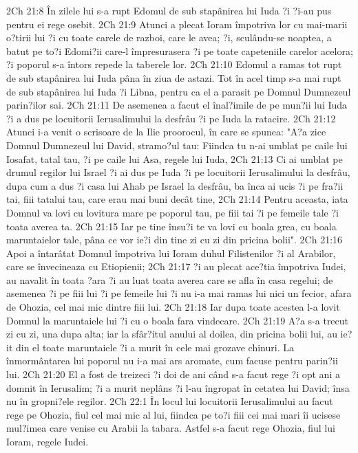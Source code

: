 2Ch 21:8  În zilele lui s-a rupt Edomul de sub stapânirea lui Iuda ?i ?i-au pus pentru ei rege osebit.
2Ch 21:9  Atunci a plecat Ioram împotriva lor cu mai-marii o?tirii lui ?i cu toate carele de razboi, care le avea; ?i, sculându-se noaptea, a batut pe to?i Edomi?ii care-l împresurasera ?i pe toate capeteniile carelor acelora; ?i poporul s-a întors repede la taberele lor.
2Ch 21:10  Edomul a ramas tot rupt de sub stapânirea lui Iuda pâna în ziua de astazi. Tot în acel timp s-a mai rupt de sub stapânirea lui Iuda ?i Libna, pentru ca el a parasit pe Domnul Dumnezeul parin?ilor sai.
2Ch 21:11  De asemenea a facut el înal?imile de pe mun?ii lui Iuda ?i a dus pe locuitorii Ierusalimului la desfrâu ?i pe Iuda la ratacire.
2Ch 21:12  Atunci i-a venit o scrisoare de la Ilie proorocul, în care se spunea: "A?a zice Domnul Dumnezeul lui David, stramo?ul tau: Fiindca tu n-ai umblat pe caile lui Iosafat, tatal tau, ?i pe caile lui Asa, regele lui Iuda,
2Ch 21:13  Ci ai umblat pe drumul regilor lui Israel ?i ai dus pe Iuda ?i pe locuitorii Ierusalimului la desfrâu, dupa cum a dus ?i casa lui Ahab pe Israel la desfrâu, ba înca ai ucis ?i pe fra?ii tai, fiii tatalui tau, care erau mai buni decât tine,
2Ch 21:14  Pentru aceasta, iata Domnul va lovi cu lovitura mare pe poporul tau, pe fiii tai ?i pe femeile tale ?i toata averea ta.
2Ch 21:15  Iar pe tine însu?i te va lovi cu boala grea, cu boala maruntaielor tale, pâna ce vor ie?i din tine zi cu zi din pricina bolii".
2Ch 21:16  Apoi a întarâtat Domnul împotriva lui Ioram duhul Filistenilor ?i al Arabilor, care se învecineaza cu Etiopienii;
2Ch 21:17  ?i au plecat ace?tia împotriva Iudei, au navalit în toata ?ara ?i au luat toata averea care se afla în casa regelui; de asemenea ?i pe fiii lui ?i pe femeile lui ?i nu i-a mai ramas lui nici un fecior, afara de Ohozia, cel mai mic dintre fiii lui.
2Ch 21:18  Iar dupa toate acestea l-a lovit Domnul la maruntaiele lui ?i cu o boala fara vindecare.
2Ch 21:19  A?a s-a trecut zi cu zi, una dupa alta; iar la sfâr?itul anului al doilea, din pricina bolii lui, au ie?it din el toate maruntaiele ?i a murit în cele mai grozave chinuri. La înmormântarea lui poporul nu i-a mai ars aromate, cum facuse pentru parin?ii lui.
2Ch 21:20  El a fost de treizeci ?i doi de ani când s-a facut rege ?i opt ani a domnit în Ierusalim; ?i a murit neplâns ?i l-au îngropat în cetatea lui David; însa nu în gropni?ele regilor.
2Ch 22:1  În locul lui locuitorii Ierusalimului au facut rege pe Ohozia, fiul cel mai mic al lui, fiindca pe to?i fiii cei mai mari îi ucisese mul?imea care venise cu Arabii la tabara. Astfel s-a facut rege Ohozia, fiul lui Ioram, regele Iudei.
